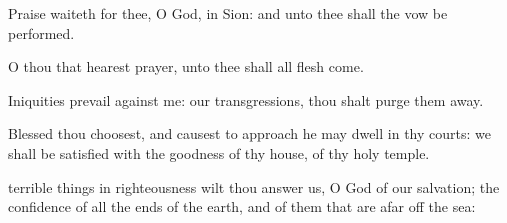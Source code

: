 {\Q {}Praise
waiteth for thee, O
God, in
Sion: and unto thee shall the
vow be
performed.


\par }{\Q {}O thou that
hearest
prayer, unto thee shall all
flesh
come.


\par }{\Q {}Iniquities
prevail against me:
{} our
transgressions, thou shalt purge them
away.


\par }{\Q {}Blessed
{} thou
choosest, and causest to
approach
{} he may
dwell in thy
courts: we shall be
satisfied with the
goodness of thy
house,
{} of thy
holy
temple.


\par }{\Q {} terrible
things in
righteousness wilt thou
answer us, O
God of our
salvation;
{} the
confidence of all the
ends of the
earth, and of them that are afar
off
{} the
sea:


\par }{\BB \par }
